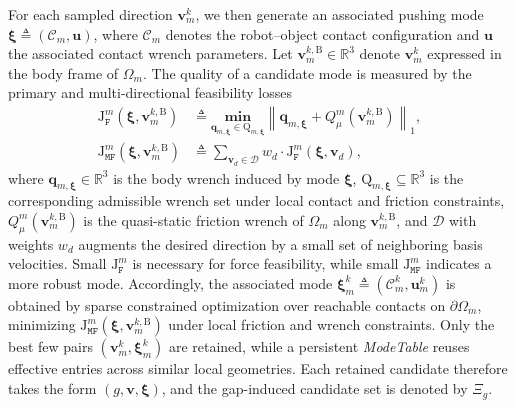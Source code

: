 For each sampled direction $\mathbf{v}_m^k$, we then generate an associated
pushing mode $\boldsymbol{\xi}\triangleq(\mathcal{C}_m,\mathbf{u})$, where
$\mathcal{C}_m$ denotes the robot--object contact configuration and
$\mathbf{u}$ the associated contact wrench parameters. Let
$\mathbf{v}_m^{k,\mathrm{B}}\in\mathbb{R}^3$ denote $\mathbf{v}_m^k$
expressed in the body frame of $\Omega_m$. The quality of a candidate mode is
measured by the primary and multi-directional feasibility losses
\begin{equation}
\label{eq:mode-feasibility}
\begin{aligned}
\mathrm{J}_{\texttt{F}}^m
(\boldsymbol{\xi},\mathbf{v}_m^{k,\mathrm{B}})
&\triangleq
\underset{\mathbf{q}_{m,\boldsymbol{\xi}} \in
\mathrm{Q}_{m,\boldsymbol{\xi}}}{\textbf{min}}
\left\|
\mathbf{q}_{m,\boldsymbol{\xi}} +
Q_\mu^m(\mathbf{v}_m^{k,\mathrm{B}})
\right\|_1,\\
\mathrm{J}_{\texttt{MF}}^m
(\boldsymbol{\xi},\mathbf{v}_m^{k,\mathrm{B}})
&\triangleq
\sum_{\mathbf{v}_d \in \mathcal{D}} w_d \cdot
\mathrm{J}_{\texttt{F}}^m(\boldsymbol{\xi},\mathbf{v}_d),
\end{aligned}
\end{equation}
where $\mathbf{q}_{m,\boldsymbol{\xi}} \in \mathbb{R}^3$ is the body wrench
induced by mode $\boldsymbol{\xi}$,
$\mathrm{Q}_{m,\boldsymbol{\xi}} \subseteq \mathbb{R}^3$ is the corresponding
admissible wrench set under local contact and friction constraints,
$Q_\mu^m(\mathbf{v}_m^{k,\mathrm{B}})$ is the quasi-static friction wrench of
$\Omega_m$ along $\mathbf{v}_m^{k,\mathrm{B}}$, and
$\mathcal{D}$ with weights $w_d$ augments the desired direction by a small set
of neighboring basis velocities. Small $\mathrm{J}_{\texttt{F}}^m$ is
necessary for force feasibility, while small $\mathrm{J}_{\texttt{MF}}^m$
indicates a more robust mode. Accordingly, the associated mode
$\boldsymbol{\xi}_m^k \triangleq (\mathcal{C}_m^k,\mathbf{u}_m^k)$ is obtained
by sparse constrained optimization over reachable contacts on
$\partial\Omega_m$, minimizing
$\mathrm{J}_{\texttt{MF}}^m(\boldsymbol{\xi},\mathbf{v}_m^{k,\mathrm{B}})$
under local friction and wrench constraints. Only the best few pairs
$(\mathbf{v}_m^k,\boldsymbol{\xi}_m^k)$ are retained, while a persistent
\emph{ModeTable} reuses effective entries across similar local geometries.
Each retained candidate therefore takes the form
$(g,\mathbf{v},\boldsymbol{\xi})$, and the gap-induced candidate set is
denoted by $\Xi_g$.

